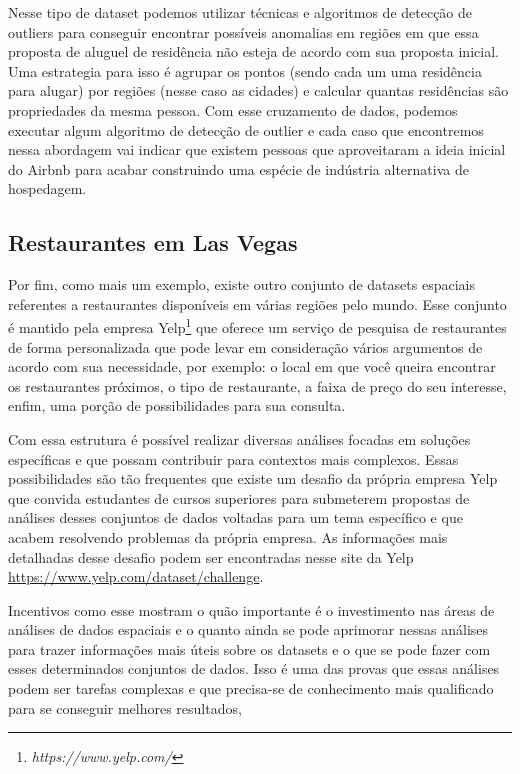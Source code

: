 Nesse tipo de dataset podemos utilizar técnicas e algoritmos de detecção de outliers para conseguir encontrar possíveis anomalias em regiões em que essa proposta de aluguel de residência não esteja de acordo com sua proposta inicial. Uma estrategia para isso é agrupar os pontos (sendo cada um uma residência para alugar) por regiões (nesse caso as cidades) e calcular quantas residências são propriedades da mesma pessoa. Com esse cruzamento de dados, podemos executar algum algoritmo de detecção de outlier e cada caso que encontremos nessa abordagem vai indicar que existem pessoas que aproveitaram a ideia inicial do Airbnb para acabar construindo uma espécie de indústria alternativa de hospedagem.

\subsection{Restaurantes em Las Vegas}

Por fim, como mais um exemplo, existe outro conjunto de datasets espaciais referentes a restaurantes disponíveis em várias regiões pelo mundo. Esse conjunto é mantido pela empresa Yelp\footnote{\it https://www.yelp.com/} que oferece um serviço de pesquisa de restaurantes de forma personalizada que pode levar em consideração vários argumentos de acordo com sua necessidade, por exemplo: o local em que você queira encontrar os restaurantes próximos, o tipo de restaurante, a faixa de preço do seu interesse, enfim, uma porção de possibilidades para sua consulta.

Com essa estrutura é possível realizar diversas análises focadas em soluções específicas e que possam contribuir para contextos mais complexos. Essas possibilidades são tão frequentes que existe um desafio da própria empresa Yelp que convida estudantes de cursos superiores para submeterem propostas de análises desses conjuntos de dados voltadas para um tema específico e que acabem resolvendo problemas da própria empresa. As informações mais detalhadas desse desafio podem ser encontradas nesse site da Yelp \url{https://www.yelp.com/dataset/challenge}.

Incentivos como esse mostram o quão importante é o investimento nas áreas de análises de dados espaciais e o quanto ainda se pode aprimorar nessas análises para trazer informações mais úteis sobre os datasets e o que se pode fazer com esses determinados conjuntos de dados. Isso é uma das provas que essas análises podem ser tarefas complexas e que precisa-se de conhecimento mais qualificado para se conseguir melhores resultados,

